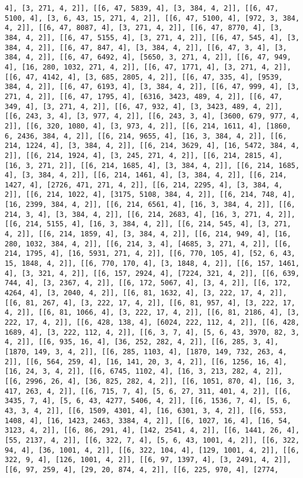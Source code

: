 \documentclass[12pt,fleqn]{article}\usepackage{../../common}
\begin{document}
\begin{verbatim}
4], [3, 271, 4, 2]], [[6, 47, 5839, 4], [3, 384, 4, 2]], [[6, 47, 5100, 4], [3, 6, 43, 15, 271, 4, 2]], [[6, 47, 5100, 4], [972, 3, 384, 4, 2]], [[6, 47, 8087, 4], [3, 271, 4, 2]], [[6, 47, 8770, 4], [3, 384, 4, 2]], [[6, 47, 5155, 4], [3, 271, 4, 2]], [[6, 47, 545, 4], [3, 384, 4, 2]], [[6, 47, 847, 4], [3, 384, 4, 2]], [[6, 47, 3, 4], [3, 384, 4, 2]], [[6, 47, 6492, 4], [5650, 3, 271, 4, 2]], [[6, 47, 949, 4], [16, 280, 1032, 271, 4, 2]], [[6, 47, 1771, 4], [3, 271, 4, 2]], [[6, 47, 4142, 4], [3, 685, 2805, 4, 2]], [[6, 47, 335, 4], [9539, 384, 4, 2]], [[6, 47, 6193, 4], [3, 384, 4, 2]], [[6, 47, 999, 4], [3, 271, 4, 2]], [[6, 47, 1795, 4], [6316, 3423, 489, 4, 2]], [[6, 47, 349, 4], [3, 271, 4, 2]], [[6, 47, 932, 4], [3, 3423, 489, 4, 2]], [[6, 243, 3, 4], [3, 977, 4, 2]], [[6, 243, 3, 4], [3600, 679, 977, 4, 2]], [[6, 320, 1080, 4], [3, 973, 4, 2]], [[6, 214, 1611, 4], [1860, 6, 2436, 384, 4, 2]], [[6, 214, 9655, 4], [16, 3, 384, 4, 2]], [[6, 214, 1224, 4], [3, 384, 4, 2]], [[6, 214, 3629, 4], [16, 5472, 384, 4, 2]], [[6, 214, 1924, 4], [3, 245, 271, 4, 2]], [[6, 214, 2815, 4], [16, 3, 271, 2]], [[6, 214, 1685, 4], [3, 384, 4, 2]], [[6, 214, 1685, 4], [3, 384, 4, 2]], [[6, 214, 1461, 4], [3, 384, 4, 2]], [[6, 214, 1427, 4], [2726, 471, 271, 4, 2]], [[6, 214, 2295, 4], [3, 384, 4, 2]], [[6, 214, 1022, 4], [3175, 5108, 384, 4, 2]], [[6, 214, 748, 4], [16, 2399, 384, 4, 2]], [[6, 214, 6561, 4], [16, 3, 384, 4, 2]], [[6, 214, 3, 4], [3, 384, 4, 2]], [[6, 214, 2683, 4], [16, 3, 271, 4, 2]], [[6, 214, 5155, 4], [16, 3, 384, 4, 2]], [[6, 214, 545, 4], [3, 271, 4, 2]], [[6, 214, 1859, 4], [3, 384, 4, 2]], [[6, 214, 949, 4], [16, 280, 1032, 384, 4, 2]], [[6, 214, 3, 4], [4685, 3, 271, 4, 2]], [[6, 214, 1795, 4], [16, 5931, 271, 4, 2]], [[6, 770, 105, 4], [52, 6, 43, 15, 1848, 4, 2]], [[6, 770, 170, 4], [3, 1848, 4, 2]], [[6, 157, 1461, 4], [3, 321, 4, 2]], [[6, 157, 2924, 4], [7224, 321, 4, 2]], [[6, 639, 744, 4], [3, 2367, 4, 2]], [[6, 172, 5067, 4], [3, 4, 2]], [[6, 172, 4264, 4], [3, 2040, 4, 2]], [[6, 81, 1632, 4], [3, 222, 17, 4, 2]], [[6, 81, 267, 4], [3, 222, 17, 4, 2]], [[6, 81, 957, 4], [3, 222, 17, 4, 2]], [[6, 81, 1066, 4], [3, 222, 17, 4, 2]], [[6, 81, 2186, 4], [3, 222, 17, 4, 2]], [[6, 428, 138, 4], [6024, 222, 112, 4, 2]], [[6, 428, 1689, 4], [3, 222, 112, 4, 2]], [[6, 3, 7, 4], [5, 6, 43, 3970, 82, 3, 4, 2]], [[6, 935, 16, 4], [36, 252, 282, 4, 2]], [[6, 285, 3, 4], [1870, 149, 3, 4, 2]], [[6, 285, 1103, 4], [1870, 149, 732, 263, 4, 2]], [[6, 564, 259, 4], [16, 141, 20, 3, 4, 2]], [[6, 1256, 16, 4], [16, 24, 3, 4, 2]], [[6, 6745, 1102, 4], [16, 3, 213, 282, 4, 2]], [[6, 2996, 26, 4], [36, 825, 282, 4, 2]], [[6, 1051, 870, 4], [16, 3, 417, 263, 4, 2]], [[6, 715, 7, 4], [5, 6, 27, 311, 401, 4, 2]], [[6, 3435, 7, 4], [5, 6, 43, 4277, 5406, 4, 2]], [[6, 1536, 7, 4], [5, 6, 43, 3, 4, 2]], [[6, 1509, 4301, 4], [16, 6301, 3, 4, 2]], [[6, 553, 1408, 4], [16, 1423, 2463, 3384, 4, 2]], [[6, 1027, 16, 4], [16, 54, 3123, 4, 2]], [[6, 86, 291, 4], [142, 2541, 4, 2]], [[6, 1441, 26, 4], [55, 2137, 4, 2]], [[6, 322, 7, 4], [5, 6, 43, 1001, 4, 2]], [[6, 322, 94, 4], [36, 1001, 4, 2]], [[6, 322, 104, 4], [129, 1001, 4, 2]], [[6, 322, 9, 4], [126, 1001, 4, 2]], [[6, 97, 1397, 4], [3, 2491, 4, 2]], [[6, 97, 259, 4], [29, 20, 874, 4, 2]], [[6, 225, 970, 4], [2774, 
\end{verbatim}
\end{document}
